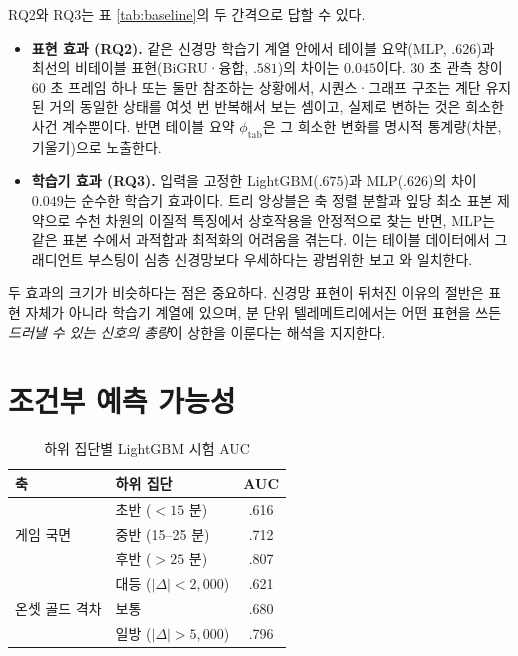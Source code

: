 RQ2와 RQ3는 표 \ref{tab:baseline}의 두 간격으로 답할 수 있다.

\begin{itemize}[leftmargin=1.5em]
  \item \textbf{표현 효과 (RQ2).} 같은 신경망 학습기 계열 안에서 테이블 요약(MLP, $.626$)과 최선의 비테이블 표현(BiGRU·융합, $.581$)의 차이는 $0.045$이다. 30 초 관측 창이 60 초 프레임 하나 또는 둘만 참조하는 상황에서, 시퀀스·그래프 구조는 계단 유지된 거의 동일한 상태를 여섯 번 반복해서 보는 셈이고, 실제로 변하는 것은 희소한 사건 계수뿐이다. 반면 테이블 요약 $\phi_{\mathrm{tab}}$은 그 희소한 변화를 명시적 통계량(차분, 기울기)으로 노출한다.
  \item \textbf{학습기 효과 (RQ3).} 입력을 고정한 LightGBM($.675$)과 MLP($.626$)의 차이 $0.049$는 순수한 학습기 효과이다. 트리 앙상블은 축 정렬 분할과 잎당 최소 표본 제약으로 수천 차원의 이질적 특징에서 상호작용을 안정적으로 찾는 반면, MLP는 같은 표본 수에서 과적합과 최적화의 어려움을 겪는다. 이는 테이블 데이터에서 그래디언트 부스팅이 심층 신경망보다 우세하다는 광범위한 보고 \cite{grinsztajn2022why}와 일치한다.
\end{itemize}

두 효과의 크기가 비슷하다는 점은 중요하다. 신경망 표현이 뒤처진 이유의 절반은 표현 자체가 아니라 학습기 계열에 있으며, 분 단위 텔레메트리에서는 어떤 표현을 쓰든 \emph{드러낼 수 있는 신호의 총량}이 상한을 이룬다는 해석을 지지한다.

\section{조건부 예측 가능성}
\label{sec:results-conditional}

\begin{table}[htbp]
  \centering
  \caption{하위 집단별 LightGBM 시험 AUC}
  \label{tab:conditional}
  \small
  \begin{tabular}{@{}llc@{}}
    \toprule
    축 & 하위 집단 & AUC \\
    \midrule
    \multirow{3}{*}{게임 국면} & 초반 ($<15$ 분) & .616 \\
     & 중반 (15--25 분) & .712 \\
     & 후반 ($>25$ 분) & .807 \\
    \midrule
    \multirow{3}{*}{온셋 골드 격차} & 대등 ($|\Delta| < 2{,}000$) & .621 \\
     & 보통 & .680 \\
     & 일방 ($|\Delta| > 5{,}000$) & .796 \\
    \bottomrule
  \end{tabular}
\end{table}

